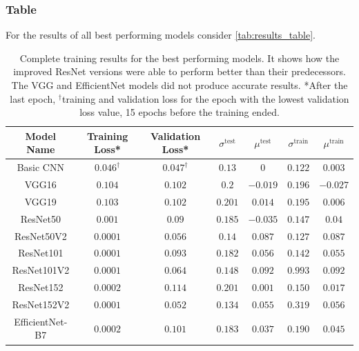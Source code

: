 \subsubsection{Table}
For the results of all best performing models consider \autoref{tab:results_table}.
\begin{table}[h]
\centering
\begin{tabular}{@{}ccccccc@{}}\toprule
Model Name & Training Loss* & Validation Loss* & $\sigma^{\text{test}}$ & $\mu^{\text{test}}$ & $\sigma^{\text{train}}$ & $\mu^{\text{train}}$ \\
\midrule
Basic CNN & $0.046^{\dag}$ & $0.047^{\dag}$ & $0.13$ & $0$ & $0.122$ & $0.003$\\
VGG16 & $0.104$ & $0.102$ & $0.2$ & $-0.019$ & $0.196$ & $-0.027$\\
VGG19 & $0.103$ & $0.102$ & $0.201$ & $0.014$ & $0.195$ & $0.006$ \\
ResNet50 & $0.001$ & $0.09$ & $0.185$ & $-0.035$ & $0.147$& $0.04$\\
ResNet50V2 & $0.0001$ & $0.056$ & $0.14$ & $0.087$ & $0.127$ & $0.087$\\
ResNet101 & $0.0001$ & $0.093$ & $0.182$ & $0.056$ & $0.142$ & $0.055$\\
ResNet101V2 & $0.0001$  &  $0.064$ & $0.148$ & $0.092$ & $0.993$ & $0.092$\\
ResNet152 & $0.0002$ & $0.114$ & $0.201$ & $0.001$ & $0.150$ & $0.017$\\
ResNet152V2 & $0.0001$  & $0.052$ & $0.134$ & $0.055$ & $0.319$ & $0.056$  \\
EfficientNet-B7 &  $0.0002$ & $0.101$ & $0.183$ & $0.037$ & $0.190$ & $0.045$ \\
\bottomrule
\end{tabular}
\caption{Complete training results for the best performing models. It shows how the improved ResNet versions were able to perform better than their predecessors. The VGG and EfficientNet models did not produce accurate results.  *After the last epoch, $^{\dag}$training and validation loss for the epoch with the lowest validation loss value, 15 epochs before the training ended.}
\label{tab:results_table}
\end{table}






